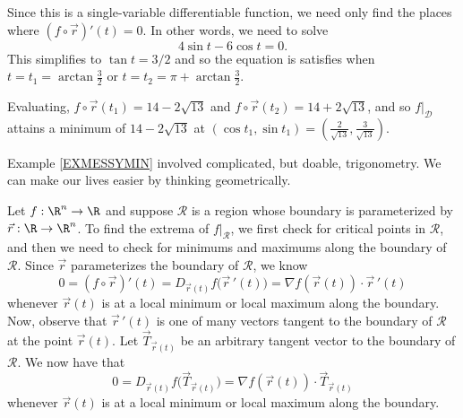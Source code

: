 \begin{example}
\begin{center}
	\end{center}

	Since this is a single-variable differentiable function, we need only find the places
	where $(f\circ \vec r)'(t)=0$.  In other words, we need to solve
	\[
		4\sin t-6\cos t=0.
	\]
	This simplifies to $\tan t = 3/2$ and so the equation is satisfies when $t=t_1=\arctan \tfrac{3}{2}$
	or $t=t_2=\pi+\arctan \tfrac{3}{2}$.

	Evaluating, $f\circ \vec r(t_1)=14-2\sqrt{13}$ and $f\circ \vec r(t_2)=14+2\sqrt{13}$, and so 
	$f\big|_{\mathcal D}$ attains a minimum of $14-2\sqrt{13}$ at $(\cos t_1,\sin t_1)=(\tfrac{2}{\sqrt{13}},
	\tfrac{3}{\sqrt{13}})$.
\end{example}

Example \ref{EXMESSYMIN} involved complicated, but doable, trigonometry.  We can make our lives
easier by thinking geometrically.

Let $f:\R^n\to \R$ and suppose $\mathcal R$ is a region whose boundary is parameterized by
$\vec r:\R\to\R^n$.  To find the extrema of $f\big|_{\mathcal R}$, we first check for
critical points in $\mathcal R$, and then we need to check for minimums and maximums along
the boundary of $\mathcal R$.  Since $\vec r$ parameterizes the boundary of $\mathcal R$, we know
\[
	0=(f\circ \vec r)'(t) = D_{\vec r(t)}f\big(\vec r\,'(t)\big)=\nabla f(\vec r(t))\cdot \vec r\,'(t)
\]
whenever $\vec r(t)$ is at a local minimum or local maximum along the boundary.  Now, observe
that $\vec r\,'(t)$ is one of many vectors tangent to the boundary of $\mathcal R$
at the point $\vec r(t)$.  Let $\vec T_{\vec r(t)}$ be an arbitrary tangent vector
to the boundary of $\mathcal R$.  We now have that 
\[
	0= D_{\vec r(t)}f\big(\vec T_{\vec r(t)}\big)=\nabla f(\vec r(t))\cdot \vec T_{\vec r(t)}
\]
whenever $\vec r(t)$ is at a local minimum or local maximum along the boundary.

